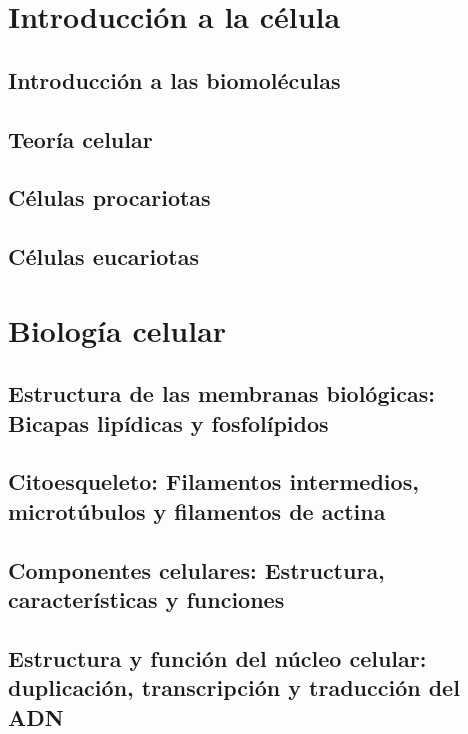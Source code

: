 \documentclass{AsignaturaResumen}
\begin{document}
    \frontmatter
    
\Portada    
\Indices

    \mainmatter


\part{Introducción a la célula}
    
    \chapter{Introducción a las biomoléculas}     
    \chapter{Teoría celular} 
    \chapter{Células procariotas} 
    \chapter{Células eucariotas} 

\part{Biología celular}
    
    \chapter[Membranas biológicas]{Estructura de las membranas biológicas: Bicapas lipídicas y fosfolípidos}     
    \chapter[Citoesqueleto]{Citoesqueleto: Filamentos intermedios, microtúbulos y filamentos de actina} 
    \chapter[Componentes intracelulares]{Componentes celulares: Estructura, características y funciones} 
    \chapter[Núcleo celular]{Estructura y función del núcleo celular: duplicación, transcripción y traducción del ADN} 
\end{document}
